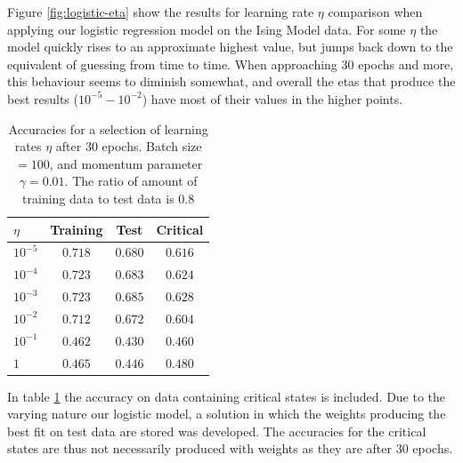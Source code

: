 Figure \ref{fig:logistic-eta} show the results for learning rate $\eta$ comparison when applying
our logistic regression model on the Ising Model data. For some $\eta$ the model quickly rises
to an approximate highest value, but jumps back down to the equivalent of guessing from time
to time. When approaching 30 epochs and more, this behaviour seems to diminish somewhat, and
overall the etas that produce the best results ($10^{-5} - 10^{-2}$) have most of their values
in the higher points.
\begin{table}[H]
\center
\begin{tabular}{l|c|c|c}
$\eta$ & Training & Test & Critical  \\
\hline
$10^{-5}$ & $0.718$ & $0.680$ & $0.616$ \\
$10^{-4}$ & $0.723$ & $0.683$ & $0.624$ \\
$10^{-3}$ & $0.723$ & $0.685$ & $0.628$ \\
$10^{-2}$ & $0.712$ & $0.672$ & $0.604$ \\
$10^{-1}$ & $0.462$ & $0.430$ & $0.460$ \\
$1$    & $0.465$ & $0.446$ & $0.480$
\end{tabular}
    \caption{Accuracies for a selection of learning rates $\eta$ after 
    30 epochs. Batch size $= 100$, and momentum parameter $\gamma = 0.01$.
    The ratio of amount of training data to test data is $0.8$}
    \label{tab:logistic-critical}
\end{table}
In table \ref{tab:logistic-critical} the accuracy on data containing critical states
is included. Due to the varying nature our logistic model, a solution in which the weights
producing the best fit on test data are stored was developed. The accuracies for the critical
states are thus not necessarily produced with weights as they are after 30 epochs.


